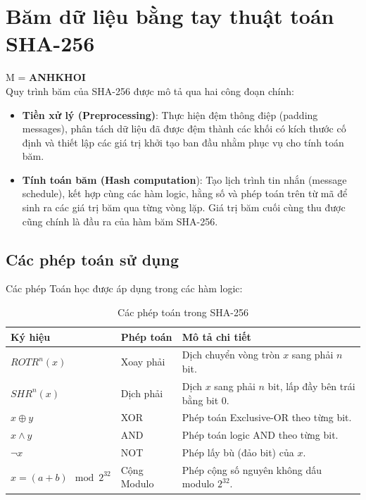 



\section{Băm dữ liệu bằng tay thuật toán SHA-256}
M = \textbf{ANHKHOI} \\

Quy trình băm của SHA-256 được mô tả qua hai công đoạn chính:
\begin{itemize}
	\item \textbf{Tiền xử lý (Preprocessing)}: Thực hiện đệm thông điệp (padding messages), phân tách dữ liệu đã được đệm thành các khối có kích thước cố định và thiết lập các giá trị khởi tạo ban đầu nhằm phục vụ cho tính toán băm.
	\item \textbf{Tính toán băm (Hash computation}): Tạo lịch trình tin nhắn (message schedule), kết hợp cùng các hàm logic, hằng số và phép toán trên từ mã để sinh ra các giá trị băm qua từng vòng lặp. Giá trị băm cuối cùng thu được cũng chính là đầu ra của hàm băm SHA-256.
\end{itemize}

\subsection{Các phép toán sử dụng}

Các phép Toán học được áp dụng trong các hàm logic:
\begin{table}[H]
	\centering
	\caption{Các phép toán trong SHA-256}
	\label{tab:sha256-ops}
	\begin{tabular}{|l|l|l|}
		\hline
		\textbf{Ký hiệu} & \textbf{Phép toán} & \textbf{Mô tả chi tiết} \\ \hline
		$ROTR^n(x)$ & Xoay phải & Dịch chuyển vòng tròn $x$ sang phải $n$ bit. \\ \hline
		$SHR^n(x)$ & Dịch phải & Dịch $x$ sang phải $n$ bit, lấp đầy bên trái bằng bit 0. \\ \hline
		$x \oplus y$ & XOR & Phép toán Exclusive-OR theo từng bit. \\ \hline
		$x \wedge y$ & AND & Phép toán logic AND theo từng bit. \\ \hline
		$\neg x$ & NOT & Phép lấy bù (đảo bit) của $x$. \\ \hline
		$x = (a+b) \mod 2^{32} $ & Cộng Modulo & Phép cộng số nguyên không dấu modulo $2^{32}$. \\ \hline
	\end{tabular}
\end{table}	

